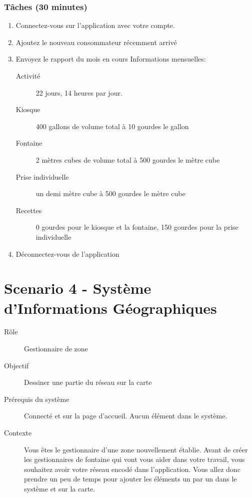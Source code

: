 \documentclass[a4paper, 11pt]{article}
\begin{document}
    \subsubsection*{Tâches (30 minutes)}
        \begin{enumerate}
            \item Connectez-vous sur l'application avec votre compte.
            \item Ajoutez le nouveau consommateur récemment arrivé
            \item Envoyez le rapport du mois en cours
            Informations mensuelles:
            \begin{description}
                \item[Activité] 22 jours, 14 heures par jour.
                \item[Kiosque] 400 gallons de volume total à 10 gourdes le gallon
                \item[Fontaine] 2 mètres cubes de volume total à 500 gourdes le mètre cube
                \item[Prise individuelle] un demi mètre cube à 500 gourdes le mètre cube
                \item[Recettes] 0 gourdes pour le kiosque et la fontaine, 150 gourdes pour la prise individuelle
            \end{description}
            \item Déconnectez-vous de l'application
        \end{enumerate}

\newpage

\section*{Scenario 4 - Système d'Informations Géographiques}
    \begin{description}
        \item[Rôle] Gestionnaire de zone
        \item[Objectif] Dessiner une partie du réseau sur la carte
        \item[Prérequis du système] Connecté et sur la page d'accueil. Aucun élément dans le système.
        \item[Contexte] Vous êtes le gestionnaire d'une zone nouvellement établie. Avant de créer les gestionnaires de fontaine qui vont vous aider dans votre travail, vous souhaitez avoir votre réseau encodé dans l'application. Vous allez donc prendre un peu de temps pour ajouter les éléments un par un dans le système et sur la carte.
    \end{description}
\end{document}
